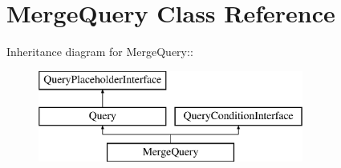 \hypertarget{classMergeQuery}{
\section{MergeQuery Class Reference}
\label{classMergeQuery}
}
Inheritance diagram for MergeQuery::\begin{figure}[H]
\begin{center}
\leavevmode
\includegraphics[height=3cm]{classMergeQuery}
\end{center}
\end{figure}
